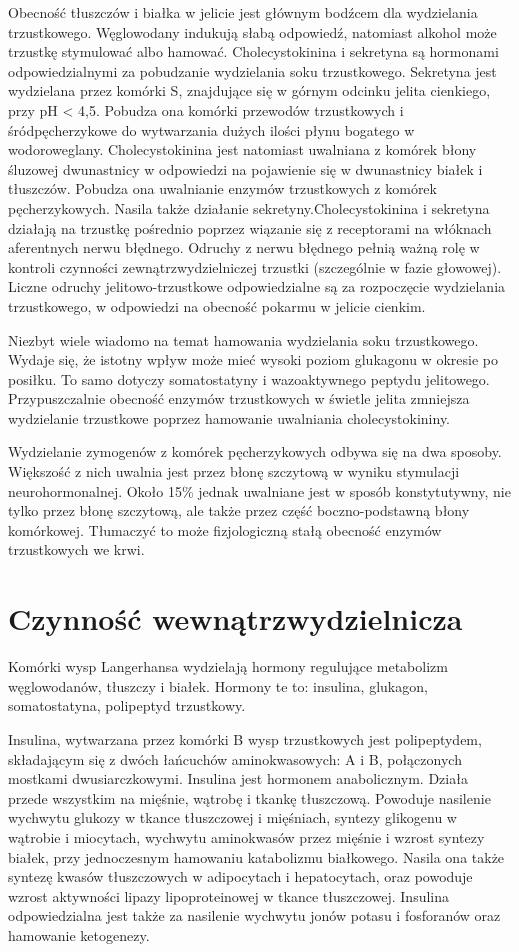 \documentclass[a4paper, 12pt]{report}
\begin{document}
Obecność tłuszczów i białka w jelicie jest głównym bodźcem dla
wydzielania trzustkowego. Węglowodany indukują słabą odpowiedź,
natomiast alkohol może trzustkę stymulować albo hamować.
Cholecystokinina i sekretyna są hormonami odpowiedzialnymi za
pobudzanie wydzielania soku trzustkowego. Sekretyna jest wydzielana
przez komórki S, znajdujące się w górnym odcinku jelita cienkiego,
przy pH < 4,5. Pobudza ona komórki przewodów trzustkowych i
śródpęcherzykowe do wytwarzania dużych ilości płynu bogatego w
wodoroweglany.  Cholecystokinina jest natomiast uwalniana z komórek
błony śluzowej dwunastnicy w odpowiedzi na pojawienie się w
dwunastnicy białek i tłuszczów. Pobudza ona uwalnianie enzymów
trzustkowych z komórek pęcherzykowych. Nasila także działanie
sekretyny.Cholecystokinina i sekretyna działają na trzustkę pośrednio
poprzez wiązanie się z receptorami na włóknach aferentnych nerwu
błędnego. Odruchy z nerwu błędnego pełnią ważną rolę w kontroli
czynności zewnątrzwydzielniczej trzustki (szczególnie w fazie
głowowej). Liczne odruchy jelitowo-trzustkowe odpowiedzialne są za
rozpoczęcie wydzielania trzustkowego, w odpowiedzi na obecność pokarmu
w jelicie cienkim.

Niezbyt wiele wiadomo na temat hamowania wydzielania soku
trzustkowego. Wydaje się, że istotny wpływ może mieć wysoki poziom
glukagonu w okresie po posiłku. To samo dotyczy somatostatyny i
wazoaktywnego peptydu jelitowego. Przypuszczalnie obecność enzymów
trzustkowych w świetle jelita zmniejsza wydzielanie trzustkowe poprzez
hamowanie uwalniania cholecystokininy.

Wydzielanie zymogenów z komórek pęcherzykowych odbywa się na dwa
sposoby. Większość z nich uwalnia jest przez błonę szczytową w wyniku
stymulacji neurohormonalnej. Około 15\% jednak uwalniane jest w sposób
konstytutywny, nie tylko przez błonę szczytową, ale także przez część
boczno-podstawną błony komórkowej. Tłumaczyć to może fizjologiczną
stałą obecność enzymów trzustkowych we krwi.

\section{Czynność wewnątrzwydzielnicza}

Komórki wysp Langerhansa wydzielają hormony regulujące metabolizm
węglowodanów, tłuszczy i białek. Hormony te to: insulina, glukagon,
somatostatyna, polipeptyd trzustkowy.

Insulina, wytwarzana przez komórki B wysp trzustkowych jest
polipeptydem, składającym się z dwóch łańcuchów aminokwasowych: A i B,
połączonych mostkami dwusiarczkowymi. Insulina jest hormonem
anabolicznym. Działa przede wszystkim na mięśnie, wątrobę i tkankę
tłuszczową.  Powoduje nasilenie wychwytu glukozy w tkance tłuszczowej
i mięśniach, syntezy glikogenu w wątrobie i miocytach, wychwytu
aminokwasów przez mięśnie i wzrost syntezy białek, przy jednoczesnym
hamowaniu katabolizmu białkowego. Nasila ona także syntezę kwasów
tłuszczowych w adipocytach i hepatocytach, oraz powoduje wzrost
aktywności lipazy lipoproteinowej w tkance tłuszczowej. Insulina
odpowiedzialna jest także za nasilenie wychwytu jonów potasu i
fosforanów oraz hamowanie ketogenezy.
\end{document}

